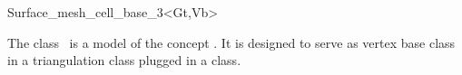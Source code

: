 

\begin{ccRefClass}{Surface_mesh_cell_base_3<Gt,Vb>}  %


\ccDefinition
  
The class \ccRefName\ is a model of the concept
.
It is designed to serve  as vertex base  class
in a  triangulation class  
plugged in a   class.


\ccIsModel








\ccSeeAlso







\end{ccRefClass}


